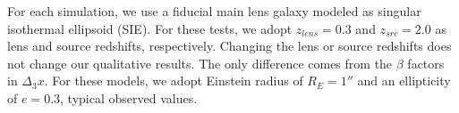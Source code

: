 For each simulation, we use a fiducial main lens galaxy modeled as singular isothermal ellipsoid (SIE). For these tests, we adopt $z_{lens} = 0.3$ and $z_{src} = 2.0$ as lens and source redshifts, respectively. Changing the lens or source redshifts does not change our qualitative results. The only difference comes from the $\beta$ factors in $\Delta_3 x$. For these models, we adopt Einstein radius of $R_E = 1''$ and an ellipticity of $e =0.3$, typical observed values.
  